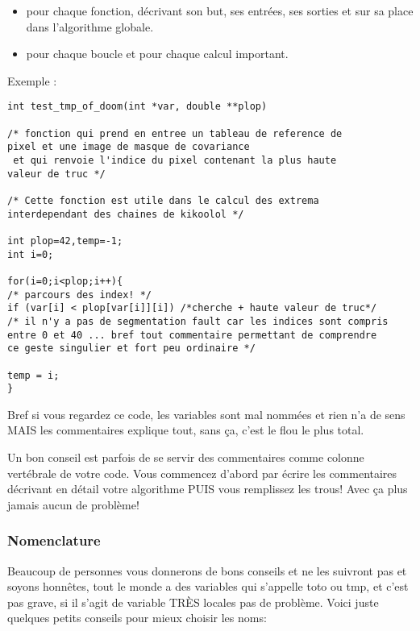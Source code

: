 \begin{itemize}
 \item pour chaque fonction,
d\'ecrivant  son but, ses entrées, ses sorties et sur sa place dans l'algorithme globale.

 \item pour chaque boucle et pour chaque calcul important. 
\end{itemize}
Exemple :
\begin{lstlisting}[style=pythonsty]
int test_tmp_of_doom(int *var, double **plop) 

/* fonction qui prend en entree un tableau de reference de 
pixel et une image de masque de covariance
 et qui renvoie l'indice du pixel contenant la plus haute 
valeur de truc */

/* Cette fonction est utile dans le calcul des extrema 
interdependant des chaines de kikoolol */

int plop=42,temp=-1;
int i=0;

for(i=0;i<plop;i++){
/* parcours des index! */
if (var[i] < plop[var[i]][i]) /*cherche + haute valeur de truc*/
/* il n'y a pas de segmentation fault car les indices sont compris 
entre 0 et 40 ... bref tout commentaire permettant de comprendre 
ce geste singulier et fort peu ordinaire */

temp = i;
}

\end{lstlisting}
Bref si vous regardez ce code, les variables sont mal nommées et rien n'a de sens MAIS les
 commentaires explique tout, sans ça, c'est le flou le plus total.

Un bon conseil est parfois de se servir des commentaires comme colonne vertébrale de votre 
code. Vous commencez d'abord par écrire les commentaires décrivant en détail votre algorithme 
PUIS vous remplissez les trous! Avec ça plus jamais aucun de problème!

\subsubsection*{Nomenclature}

Beaucoup de personnes vous donnerons de bons conseils et ne les suivront pas et soyons honnêtes, 
tout le monde a des variables qui s'appelle toto ou tmp, et c'est pas grave, si il s'agit de 
variable TRÈS locales pas de problème. 
Voici juste quelques petits conseils pour mieux choisir 
les noms:

